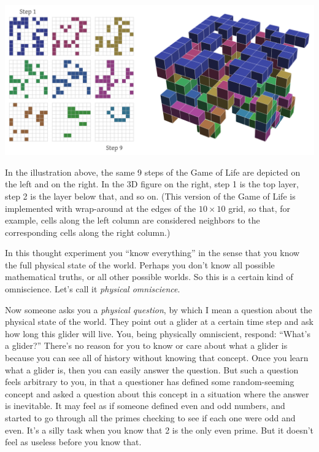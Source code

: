 \documentclass[9pt, twoside]{book}
\theoremstyle{argtstyle}
\begin{document}
\begin{center}
\includegraphics[width=\textwidth]{gameoflife_3d_2.png}
\end{center}

In the illustration above, the same 9 steps of the Game of Life are depicted on
the left and on the right. In the 3D figure on the right, step 1 is the top
layer, step 2 is the layer below that, and so on. (This version of the Game of
Life is implemented with wrap-around at the edges of the $10\times 10$ grid, so
that, for example, cells along the left column are considered neighbors to the
corresponding cells along the right column.)

In this thought experiment you ``know everything'' in the sense that you know
the full physical state
of the world. Perhaps you don't know all possible mathematical truths, or all
other possible worlds. So this is a certain kind of omniscience. Let's call it
{\em physical omniscience}.

Now someone asks you a {\em physical question}, by which I mean
a question about the physical state of the world.
They point out a glider at a certain time step and
ask how long this glider will live. You, being physically omniscient,
respond:
``What's a glider?'' There's no reason for you to know or care about what a
glider is because you can see all of history without knowing that concept.
Once you
learn what a glider is, then you can easily answer the question. But such a
question feels arbitrary to you, in that a questioner has defined some
random-seeming concept and asked a question about this concept in a situation
where
the answer is inevitable. It may feel as if someone defined even and odd
numbers, and started to go through all the primes checking to see if each one
were odd and even. It's a silly task when you know that 2 is the only
even prime. But it doesn't feel as useless before you know that.
\end{document}
